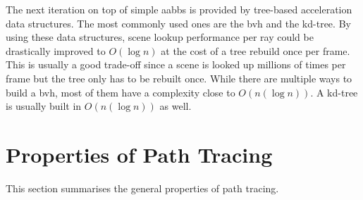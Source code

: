 \documentclass[
  twoside,
  11pt, a4paper,
  footinclude=true,
  headinclude=true,
  cleardoublepage=empty
]{scrreprt}
\begin{document}
The next iteration on top of simple \acp{aabb} is provided by tree-based acceleration data
structures. The most commonly used ones are the \ac{bvh} and the kd-tree. By using these data
structures, scene lookup performance per ray could be drastically improved to \(O(\log n)\) at the
cost of a tree rebuild once per frame. This is usually a good trade-off since a scene is looked up
millions of times per frame but the tree only has to be rebuilt once. While there are multiple
ways to build a \ac{bvh}, most of them have a complexity close to \(O(n(\log n))\). A kd-tree is
usually built in \(O(n(\log n))\) as well.

\section{Properties of Path Tracing}
This section summarises the general properties of path tracing.
\end{document}
